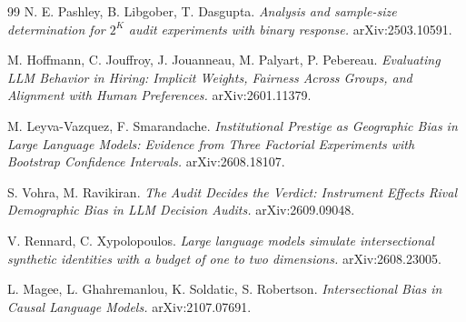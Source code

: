 \documentclass[11pt]{article}
\begin{document}
\begin{thebibliography}{99}
 N. E. Pashley, B. Libgober, T. Dasgupta. \emph{Analysis
and sample-size determination for $2^K$ audit experiments with binary response.}
arXiv:2503.10591.

 M. Hoffmann, C. Jouffroy, J. Jouanneau, M. Palyart, P.
Pebereau. \emph{Evaluating LLM Behavior in Hiring: Implicit Weights, Fairness
Across Groups, and Alignment with Human Preferences.} arXiv:2601.11379.

 M. Leyva-Vazquez, F. Smarandache. \emph{Institutional
Prestige as Geographic Bias in Large Language Models: Evidence from Three
Factorial Experiments with Bootstrap Confidence Intervals.} arXiv:2608.18107.

 S. Vohra, M. Ravikiran. \emph{The Audit Decides the Verdict:
Instrument Effects Rival Demographic Bias in LLM Decision Audits.} arXiv:2609.09048.

 V. Rennard, C. Xypolopoulos. \emph{Large language models
simulate intersectional synthetic identities with a budget of one to two
dimensions.} arXiv:2608.23005.

 L. Magee, L. Ghahremanlou, K. Soldatic, S. Robertson.
\emph{Intersectional Bias in Causal Language Models.} arXiv:2107.07691.

\end{thebibliography}
\end{document}

